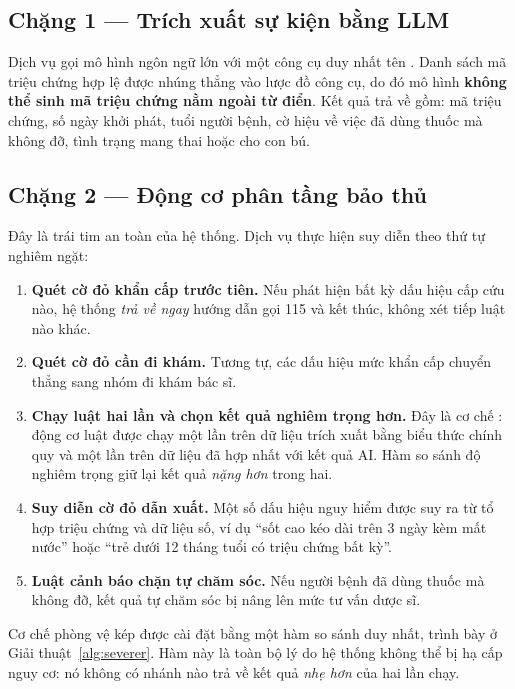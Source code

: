 \subsection{Chặng 1 — Trích xuất sự kiện bằng LLM}

Dịch vụ  gọi mô hình ngôn ngữ lớn với một công cụ
duy nhất tên . Danh sách mã triệu chứng hợp lệ
được nhúng thẳng vào lược đồ công cụ, do đó mô hình \textbf{không thể sinh mã
triệu chứng nằm ngoài từ điển}. Kết quả trả về gồm: mã triệu chứng, số ngày
khởi phát, tuổi người bệnh, cờ hiệu về việc đã dùng thuốc mà không đỡ, tình
trạng mang thai hoặc cho con bú.

\subsection{Chặng 2 — Động cơ phân tầng bảo thủ}

Đây là trái tim an toàn của hệ thống. Dịch vụ  thực
hiện suy diễn theo thứ tự nghiêm ngặt:

\begin{enumerate}[leftmargin=1.6em, itemsep=2pt]
  \item \textbf{Quét cờ đỏ khẩn cấp trước tiên.} Nếu phát hiện bất kỳ dấu hiệu
        cấp cứu nào, hệ thống \emph{trả về ngay} hướng dẫn gọi 115 và kết thúc,
        không xét tiếp luật nào khác.
  \item \textbf{Quét cờ đỏ cần đi khám.} Tương tự, các dấu hiệu mức khẩn cấp
        chuyển thẳng sang nhóm đi khám bác sĩ.
  \item \textbf{Chạy luật hai lần và chọn kết quả nghiêm trọng hơn.} Đây là cơ
        chế : động cơ luật được chạy
        một lần trên dữ liệu trích xuất bằng biểu thức chính quy và một lần trên
        dữ liệu đã hợp nhất với kết quả AI. Hàm so sánh độ nghiêm trọng giữ lại
        kết quả \emph{nặng hơn} trong hai.
  \item \textbf{Suy diễn cờ đỏ dẫn xuất.} Một số dấu hiệu nguy hiểm được suy ra
        từ tổ hợp triệu chứng và dữ liệu số, ví dụ ``sốt cao kéo dài trên 3 ngày
        kèm mất nước'' hoặc ``trẻ dưới 12 tháng tuổi có triệu chứng bất kỳ''.
  \item \textbf{Luật cảnh báo chặn tự chăm sóc.} Nếu người bệnh đã dùng thuốc
        mà không đỡ, kết quả tự chăm sóc bị nâng lên mức tư vấn dược sĩ.
\end{enumerate}

Cơ chế phòng vệ kép được cài đặt bằng một hàm so sánh duy nhất, trình bày ở
Giải thuật~\ref{alg:severer}. Hàm này là toàn bộ lý do hệ thống không thể bị hạ
cấp nguy cơ: nó không có nhánh nào trả về kết quả \emph{nhẹ hơn} của hai lần
chạy.

